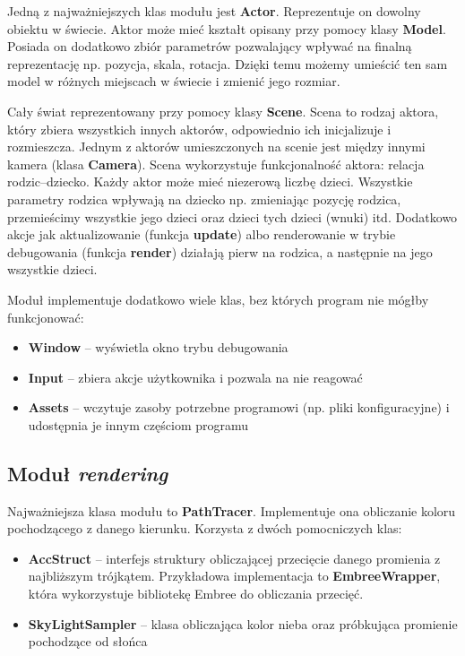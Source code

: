 \documentclass[inz,shortabstract]{iithesis}
\begin{document}
            Jedną z najważniejszych klas modułu jest \textbf{Actor}. Reprezentuje on dowolny obiektu w świecie. Aktor może mieć kształt opisany przy pomocy klasy \textbf{Model}. Posiada on dodatkowo zbiór parametrów pozwalający wpływać na finalną reprezentację np. pozycja, skala, rotacja. Dzięki temu możemy umieścić ten sam model w różnych miejscach w świecie i zmienić jego rozmiar.
            
            Cały świat reprezentowany przy pomocy klasy \textbf{Scene}. Scena to rodzaj aktora, który zbiera wszystkich innych aktorów, odpowiednio ich inicjalizuje i rozmieszcza. Jednym z aktorów umieszczonych na scenie jest między innymi kamera (klasa \textbf{Camera}). Scena wykorzystuje funkcjonalność aktora: relacja rodzic--dziecko. Każdy aktor może mieć niezerową liczbę dzieci. Wszystkie parametry rodzica wpływają na dziecko np. zmieniając pozycję rodzica, przemieścimy wszystkie jego dzieci oraz dzieci tych dzieci (wnuki) itd. Dodatkowo akcje jak aktualizowanie (funkcja \textbf{update}) albo renderowanie w trybie debugowania (funkcja \textbf{render}) działają pierw na rodzica, a następnie na jego wszystkie dzieci.
            
            Moduł implementuje dodatkowo wiele klas, bez których program nie mógłby funkcjonować:
            \begin{itemize}
                \item \textbf{Window} -- wyświetla okno trybu debugowania
                \item \textbf{Input} -- zbiera akcje użytkownika i pozwala na nie reagować
                \item \textbf{Assets} -- wczytuje zasoby potrzebne programowi (np. pliki konfiguracyjne) i udostępnia je innym częściom programu 
            \end{itemize}
            
        \subsection{Moduł \textit{rendering}}
            Najważniejsza klasa modułu to \textbf{PathTracer}. Implementuje ona obliczanie koloru pochodzącego z danego kierunku. Korzysta z dwóch pomocniczych klas:
            \begin{itemize}
                \item \textbf{AccStruct} -- interfejs struktury obliczającej przecięcie danego promienia z najbliższym trójkątem. Przykładowa implementacja to \textbf{EmbreeWrapper}, która wykorzystuje bibliotekę Embree do obliczania przecięć. 
                \item \textbf{SkyLightSampler} -- klasa obliczająca kolor nieba oraz próbkująca promienie pochodzące od słońca
            \end{itemize}
            
\end{document}
